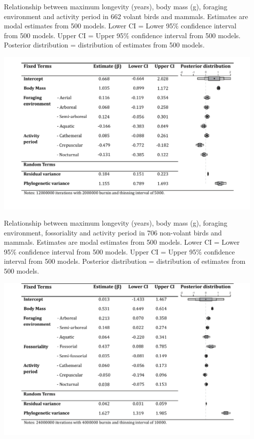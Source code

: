 \begin{table}[h]
  \caption[Table 2.]{Relationship between maximum longevity (years), body mass (g), foraging environment and activity period in 662 volant birds and mammals. Estimates are modal estimates from 500 models. Lower CI = Lower 95\% confidence interval from 500 models. Upper CI = Upper 95\% confidence interval from 500 models. Posterior distribution = distribution of estimates from 500 models.}
  \label{tbl:Table 2.}
  \includegraphics[width=\linewidth]{ch3-longevity/Table2.pdf}
\end{table}


\begin{table}[h]
  \caption[Table 3.]{Relationship between maximum longevity (years), body mass (g), foraging environment, fossoriality and activity period in 706 non-volant birds and mammals. Estimates are modal estimates from 500 models. Lower CI = Lower 95\% confidence interval from 500 models. Upper CI = Upper 95\% confidence interval from 500 models. Posterior distribution = distribution of estimates from 500 models.}
  \label{tbl:Table 3.}
  \includegraphics[width=\linewidth]{ch3-longevity/Table3.pdf}
\end{table}



